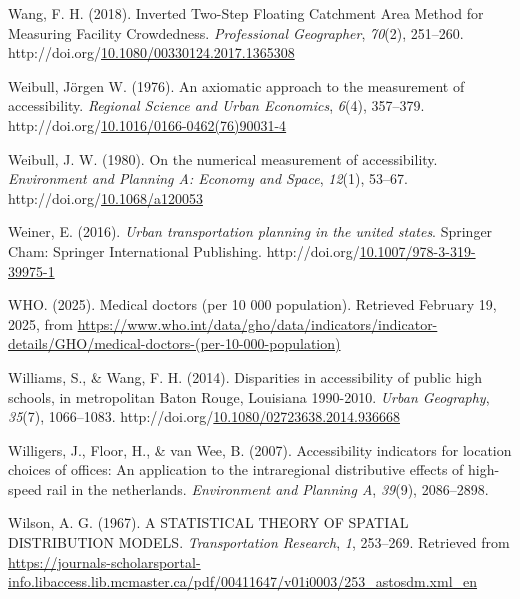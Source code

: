 \documentclass[
11pt, %
oneside, %
english, %
singlespacing, %
]{macthesis} %
\newlength{\cslhangindent}
\newenvironment{CSLReferences}[2] %
{\begin{list}{}{%
	\setlength{\itemindent}{0pt}
	\setlength{\leftmargin}{0pt}
	\setlength{\parsep}{0pt}
	\ifodd #1
	\setlength{\leftmargin}{\cslhangindent}
	\setlength{\itemindent}{-1\cslhangindent}
	\fi
	\setlength{\itemsep}{#2\baselineskip}}}
{\end{list}}
\begin{document}
\begin{CSLReferences}{1}{0}
Wang, F. H. (2018). Inverted {Two}-{Step} {Floating} {Catchment} {Area} {Method} for {Measuring} {Facility} {Crowdedness}. \emph{Professional Geographer}, \emph{70}(2), 251--260. http://doi.org/\href{https://doi.org/10.1080/00330124.2017.1365308}{10.1080/00330124.2017.1365308}

Weibull, Jörgen W. (1976). An axiomatic approach to the measurement of accessibility. \emph{Regional Science and Urban Economics}, \emph{6}(4), 357--379. http://doi.org/\href{https://doi.org/10.1016/0166-0462(76)90031-4}{10.1016/0166-0462(76)90031-4}

Weibull, J. W. (1980). On the numerical measurement of accessibility. \emph{Environment and Planning A: Economy and Space}, \emph{12}(1), 53--67. http://doi.org/\href{https://doi.org/10.1068/a120053}{10.1068/a120053}

Weiner, E. (2016). \emph{Urban transportation planning in the united states}. Springer Cham: Springer International Publishing. http://doi.org/\href{https://doi.org/10.1007/978-3-319-39975-1}{10.1007/978-3-319-39975-1}

WHO. (2025). Medical doctors (per 10 000 population). Retrieved February 19, 2025, from \url{https://www.who.int/data/gho/data/indicators/indicator-details/GHO/medical-doctors-(per-10-000-population)}

Williams, S., \& Wang, F. H. (2014). Disparities in accessibility of public high schools, in metropolitan {Baton} {Rouge}, {Louisiana} 1990-2010. \emph{Urban Geography}, \emph{35}(7), 1066--1083. http://doi.org/\href{https://doi.org/10.1080/02723638.2014.936668}{10.1080/02723638.2014.936668}

Willigers, J., Floor, H., \& van Wee, B. (2007). Accessibility indicators for location choices of offices: An application to the intraregional distributive effects of high-speed rail in the netherlands. \emph{Environment and Planning A}, \emph{39}(9), 2086--2898.

Wilson, A. G. (1967). A {STATISTICAL} {THEORY} {OF} {SPATIAL} {DISTRIBUTION} {MODELS}. \emph{Transportation Research}, \emph{1}, 253--269. Retrieved from \url{https://journals-scholarsportal-info.libaccess.lib.mcmaster.ca/pdf/00411647/v01i0003/253_astosdm.xml_en}


\end{CSLReferences}
\end{document}
